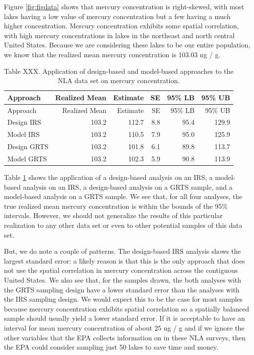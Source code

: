 \documentclass[]{elsarticle} %
\begin{document}
Figure \ref{fig:figdata} shows that mercury concentration is
right-skewed, with most lakes having a low value of mercury
concentration but a few having a much higher concentration. Mercury
concentration exhibits some spatial correlation, with high mercury
concentrations in lakes in the northeast and north central United
States. Because we are considering these lakes to be our entire
population, we know that the realized mean mercury concentration is
103.03 ng / g.

\begin{longtable}[]{@{}lrrrrr@{}}
\caption{\label{tab:appliedtab} Table XXX. Application of design-based
and model-based approaches to the NLA data set on mercury
concentration.}\tabularnewline
\toprule
Approach & Realized Mean & Estimate & SE & 95\% LB & 95\%
UB\tabularnewline
\midrule
\endfirsthead
\toprule
Approach & Realized Mean & Estimate & SE & 95\% LB & 95\%
UB\tabularnewline
\midrule
\endhead
Design IRS & 103.2 & 112.7 & 8.8 & 95.4 & 129.9\tabularnewline
Model IRS & 103.2 & 110.5 & 7.9 & 95.0 & 125.9\tabularnewline
Design GRTS & 103.2 & 101.8 & 6.1 & 89.8 & 113.7\tabularnewline
Model GRTS & 103.2 & 102.3 & 5.9 & 90.8 & 113.9\tabularnewline
\bottomrule
\end{longtable}

Table \ref{tab:appliedtab} shows the application of a design-based
analysis on an IRS, a model-based analysis on an IRS, a design-based
analysis on a GRTS sample, and a model-based analysis on a GRTS sample.
We see that, for all four analyses, the true realized mean mercury
concentration is within the bounds of the 95\% intervals. However, we
should not generalize the results of this particular realization to any
other data set or even to other potential samples of this data set.

But, we do note a couple of patterns. The design-based IRS analysis
shows the largest standard error: a likely reason is that this is the
only approach that does not use the spatial correlation in mercury
concentration across the contiguous United States. We also see that, for
the samples drawn, the both analyses with the GRTS sampling design have
a lower standard error than the analyses with the IRS sampling design.
We would expect this to be the case for most samples because mercury
concentration exhibits spatial correlation so a spatially balanced
sample should usually yield a lower standard error. If it is acceptable
to have an interval for mean mercury concentration of about 25 ng / g
and if we ignore the other variables that the EPA collects information
on in these NLA surveys, then the EPA could consider sampling just 50
lakes to save time and money.
\end{document}
